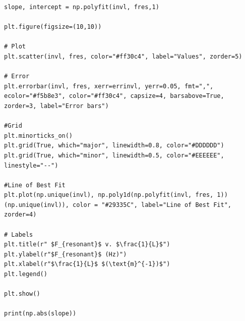 \documentclass[12pt]{article}
\begin{document}
\begin{minipage}{\linewidth}
\captionsetup{hypcap=false}

\begin{mintedbox}
\begin{verbatim}
slope, intercept = np.polyfit(invl, fres,1)

plt.figure(figsize=(10,10))

# Plot
plt.scatter(invl, fres, color="#ff30c4", label="Values", zorder=5)

# Error
plt.errorbar(invl, fres, xerr=errinvl, yerr=0.05, fmt=",", ecolor="#f5b8e3", color="#ff30c4", capsize=4, barsabove=True, zorder=3, label="Error bars")

#Grid
plt.minorticks_on()
plt.grid(True, which="major", linewidth=0.8, color="#DDDDDD")
plt.grid(True, which="minor", linewidth=0.5, color="#EEEEEE", linestyle="--")

#Line of Best Fit
plt.plot(np.unique(invl), np.poly1d(np.polyfit(invl, fres, 1))(np.unique(invl)), color = "#29335C", label="Line of Best Fit", zorder=4)

# Labels
plt.title(r" $F_{resonant}$ v. $\frac{1}{L}$")
plt.ylabel(r"$F_{resonant}$ (Hz)")
plt.xlabel(r"$\frac{1}{L}$ $(\text{m}^{-1})$")
plt.legend()

plt.show()

print(np.abs(slope))

\end{verbatim}
\end{mintedbox}
\end{minipage}
    
\end{document}
